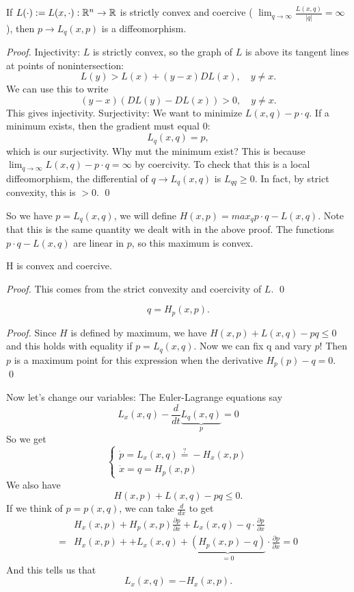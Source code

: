 \begin{proposition}
If $L(\cdot) := L(x,\cdot):\mathbb{R}^n \to \mathbb{R}$ is strictly convex and coercive ( $\lim_{q\to \infty} \frac{L(x,q)}{|q|} = \infty$), then $p\to L_q(x,p)$ is a diffeomorphism.
\end{proposition}

\begin{proof}
    Injectivity: $L$ is strictly convex, so the graph of $L$ is above its tangent lines at points of nonintersection: 
    \[
        L(y)>L(x)+(y-x) D L(x), \quad y \neq x.
    \]
    We  can use this to write 
    \[
        (y-x)(D L(y)-D L(x))>0, \quad y \neq x.
    \]
    This gives injectivity.
    Surjectivity: We want to minimize $L(x,q)-p\cdot q$. If a minimum exists, then the gradient must equal $0$: 
    \[
        L_q(x,q) = p,
    \]
    which is our surjectivity. Why mut the minimum exist? This is because $\lim_{q\to \infty}L(x,q) - p\cdot q = \infty$ by coercivity. 
    To check that this is a local diffeomorphism, the differential of $q \to L_q(x,q)$ is $L_{qq} \ge 0$. In fact, by strict convexity, this is $>0$. 
    \qed 
\end{proof}

So we have $p=L_q(x,q)$, we will define $H(x,p) = max_{q} p\cdot q - L(x,q)$. Note that this is the same quantity we dealt with in the above proof. The functions $p\cdot q -L(x,q)$ are linear in $p$, so this maximum is convex.

\begin{proposition}
    H is convex and coercive.
\end{proposition}
\begin{proof}
    This comes from the strict convexity and coercivity of $L$. \qed 
\end{proof}
\begin{proposition}
    \[
        q = H_p(x,p).
    \]
\end{proposition}

\begin{proof}
    Since $H$ is defined by maximum, we have $H(x,p)+ L(x,q) -pq \le 0$ and this holds with equality if $p=L_q(x,q)$. Now we can fix q and vary $p$! Then $p$ is a maximum point for this expression when the derivative $H_p(p) -q = 0$. \qed 
\end{proof}

Now let's change our variables: The Euler-Lagrange equations say 
\[
    L_x(x,q) - \frac{d}{dt}\underbrace{L_q(x,q)}_{p} = 0
\]
So we get 
\[
    \left\{\begin{array}{l}
        \dot{p}=L_{x}(x, q) \stackrel{?}{=}-H_{x}(x, p) \\
        \dot{x}=q=H_{p}(x, p)
        \end{array}\right.
\]
We also have 
\[
    H(x,p)+ L(x,q) -pq \le 0.
\]
If we think of $p=p(x,q)$, we can take $\frac{d}{dx}$ to get 
\begin{align*}
    &H_x(x,p) + H_p(x,p) \frac{\partial p}{\partial x} +L_x(x,q) - q\cdot \frac{\partial p}{\partial x}\\
    =& H_x(x,p) + +L_x(x,q) +\underbrace{(H_p(x,p) - q)}_{=0}\cdot \frac{\partial p}{\partial x}=0
\end{align*}
And this tells us that
\[
    L_x(x,q) = -H_x(x,p).
\]
